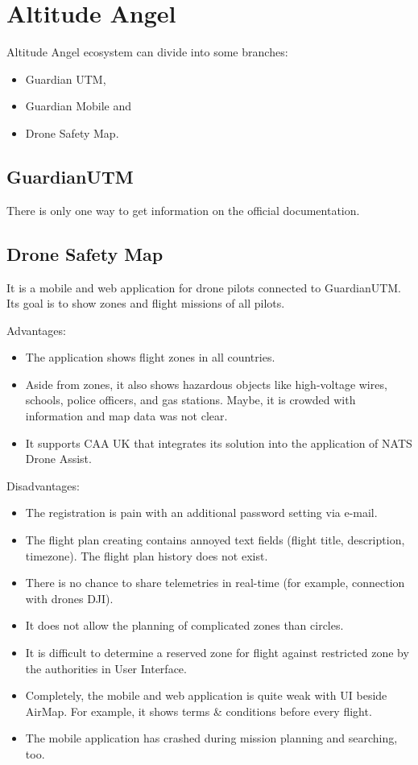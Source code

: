\section{Altitude Angel}\label{sec:altitude-angel}
Altitude Angel ecosystem can divide into some branches:
\begin{itemize}
    \item Guardian UTM,
    \item Guardian Mobile and
    \item Drone Safety Map.
\end{itemize}

\subsection{GuardianUTM}\label{subsec:guardianutm}
There is only one way to get information on the official documentation.\cite{altitudeAngel}


\subsection{Drone Safety Map}\label{subsec:drone-safety-map}
It is a mobile and web application for drone pilots connected to GuardianUTM. Its goal is to show zones and flight missions of all pilots.

Advantages:
\begin{itemize}
    \item The application shows flight zones in all countries.
    \item Aside from zones, it also shows hazardous objects like high-voltage wires, schools, police officers, and gas stations.
    Maybe, it is crowded with information and map data was not clear.
    \item It supports CAA UK that integrates its solution into the application of NATS Drone Assist.
\end{itemize}
Disadvantages:
\begin{itemize}
    \item The registration is pain with an additional password setting via e-mail.
    \item The flight plan creating contains annoyed text fields (flight title, description, timezone).
    The flight plan history does not exist.
    \item There is no chance to share telemetries in real-time (for example, connection with drones DJI).
    \item It does not allow the planning of complicated zones than circles.
    \item It is difficult to determine a reserved zone for flight against restricted zone by the authorities in User Interface.
    \item Completely, the mobile and web application is quite weak with UI beside AirMap.
    For example, it shows terms \& conditions before every flight.
    \item The mobile application has crashed during mission planning and searching, too.
\end{itemize}
